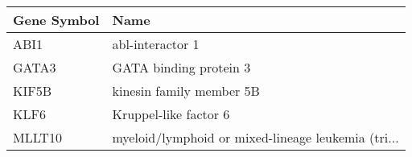 \begin{tabular}{ll}
\toprule
Gene Symbol &                                               Name \\
\midrule
       ABI1 &                                   abl-interactor 1 \\
      GATA3 &                             GATA binding protein 3 \\
      KIF5B &                           kinesin family member 5B \\
       KLF6 &                              Kruppel-like factor 6 \\
     MLLT10 & myeloid/lymphoid or mixed-lineage leukemia (tri... \\
\bottomrule
\end{tabular}
